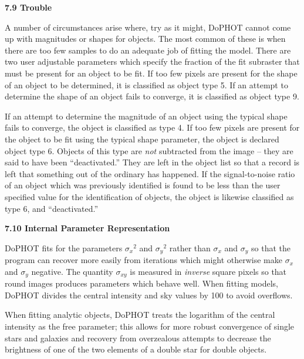 \centerline{\bf 7.9 Trouble}

A number of circumstances arise where, try as it might,
DoPHOT cannot come up with magnitudes or shapes for objects.
The most common of these is when there are too few samples
to do an adequate job of fitting the model.  There are two
user adjustable parameters which specify the fraction of the
fit subraster that must be present for an object to be fit.
If too few pixels are present for the shape of an object to
be determined, it is classified as object type 5.  If an
attempt to determine the shape of an object fails to converge,
it is classified as object type 9.

If an attempt to determine the magnitude of an object using
the typical shape fails to converge, the object is
classified as type 4.  If too few pixels are present for the
object to be fit using the typical shape parameter, the
object is declared object type 6.  Objects of this type are
{\it not} subtracted from the image -- they are said to have
been ``deactivated.''  They are left in the object list so
that a record is left that something out of the ordinary has
happened.  If the signal-to-noise ratio of an object which
was previously identified is found to be less than the user
specified value for the identification of objects, the object
is likewise classified as type 6, and ``deactivated.''  

\centerline{\bf 7.10  Internal Parameter Representation}

DoPHOT fits for the parameters ${\sigma_x}^2$ and
${\sigma_y}^2$ rather than $\sigma_x$ and $\sigma_y$ so that
the program can recover more easily from iterations which
might otherwise make $\sigma_x$ and $\sigma_y$ negative.
The quantity $\sigma_{xy}$ is measured in {\it inverse}
square pixels so that round images produces parameters which
behave well.  When fitting models, DoPHOT divides the
central intensity and sky values by 100 to avoid overflows.

When fitting analytic objects, DoPHOT
treats the logarithm of the central intensity as the free
parameter; this allows for more robust convergence of single 
stars and galaxies and recovery from overzealous attempts to
decrease the brightness of one of the two elements of a
double star for double objects.  







































